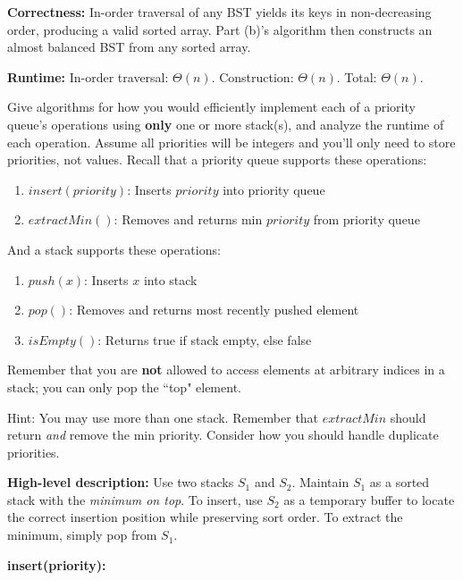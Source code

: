 \documentclass[addpoints]{exam}
\begin{document}
\begin{questions}
\begin{parts}
\textbf{Correctness:} In-order traversal of any BST yields its keys in non-decreasing order, producing a valid sorted array. Part (b)'s algorithm then constructs an almost balanced BST from any sorted array.

\textbf{Runtime:} In-order traversal: $\Theta(n)$. Construction: $\Theta(n)$. Total: $\Theta(n)$.

%

\end{parts}


\question[20] Give algorithms for how you would efficiently implement each of a priority queue's operations using \textbf{only} one or more stack(s), and analyze the runtime of each operation. Assume all priorities will be integers and you'll only need to store priorities, not values. Recall that a priority queue supports these operations:

\begin{enumerate}
  \item $insert(priority)$: Inserts $priority$ into priority queue
  \item $extractMin()$: Removes and returns min $priority$ from priority queue
\end{enumerate}

And a stack supports these operations:

\begin{enumerate}
  \item $push(x)$: Inserts $x$ into stack
  \item $pop()$: Removes and returns most recently pushed element
  \item $isEmpty()$: Returns true if stack empty, else false
\end{enumerate}

Remember that you are \textbf{not} allowed to access elements at arbitrary indices in a stack; you can only pop the ``top" element.

Hint: You may use more than one stack. Remember that $extractMin$ should return \textit{and} remove the min priority. Consider how you should handle duplicate priorities.

\textbf{High-level description:} Use two stacks $S_1$ and $S_2$. Maintain $S_1$ as a sorted stack with the \emph{minimum on top}. To insert, use $S_2$ as a temporary buffer to locate the correct insertion position while preserving sort order. To extract the minimum, simply pop from $S_1$.

\bigskip
\textbf{insert(priority):}


\end{questions}
\end{document}

